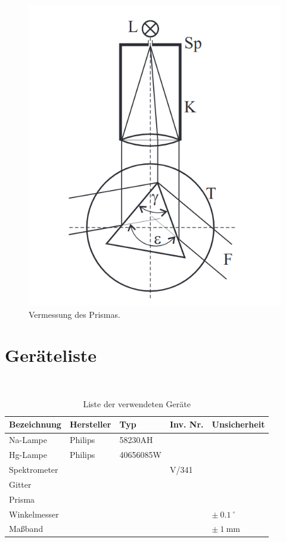 \documentclass{article}
\begin{document}
\begin{figure}[H]
\centering
\includegraphics[scale=1.5]{prisma1.png}
\caption{Vermessung des Prismas.}
\label{fig:prisma}
\end{figure}


\section{Geräteliste}

\begin{table}[H]
\caption{Liste der verwendeten Geräte}

~

\begin{tabular}{l|llll}
Bezeichnung & Hersteller & Typ & Inv. Nr. & Unsicherheit \\
\hline
Na-Lampe & Philips & 58230AH \\
Hg-Lampe & Philips & 40656085W \\
Spektrometer & & & V/341 \\
Gitter & & \\
Prisma & & \\
Winkelmesser & & & & $\pm~0.1~^\circ$ \\
Maßband & & & & $\pm~1~$mm
\end{tabular}

\end{table}
\end{document}
